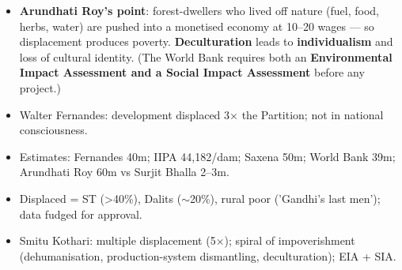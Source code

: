 \begin{KeyConcept}
\begin{itemize}
\item \textbf{Arundhati Roy's point}: forest-dwellers who lived off nature (fuel, food, herbs, water) are pushed into a monetised economy at \rupee{}10--20 wages --- so displacement produces poverty. \textbf{Deculturation} leads to \textbf{individualism} and loss of cultural identity. (The World Bank requires both an \textbf{Environmental Impact Assessment and a Social Impact Assessment} before any project.)
\end{itemize}
\end{KeyConcept}

\begin{QuickRevision}
\begin{itemize}
\item Walter Fernandes: development displaced 3$\times$ the Partition; not in national consciousness.
\item Estimates: Fernandes 40m; IIPA 44,182/dam; Saxena 50m; World Bank 39m; Arundhati Roy 60m vs Surjit Bhalla 2--3m.
\item Displaced = ST (>40\%), Dalits ($\sim$20\%), rural poor ('Gandhi's last men'); data fudged for approval.
\item Smitu Kothari: multiple displacement (5$\times$); spiral of impoverishment (dehumanisation, production-system dismantling, deculturation); EIA + SIA.
\end{itemize}
\end{QuickRevision}
